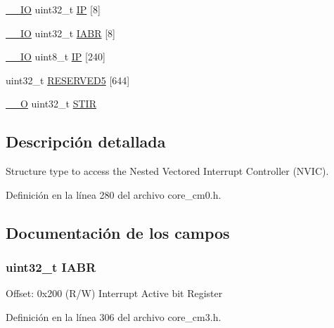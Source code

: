 \begin{DoxyCompactItemize}
\item 
\hyperlink{core__sc300_8h_aec43007d9998a0a0e01faede4133d6be}{\+\_\+\+\_\+\+IO} uint32\+\_\+t \hyperlink{struct_n_v_i_c___type_a519d82311efa6ead6f53b495d3d80de8}{IP} \mbox{[}8\mbox{]}
\item 
\hyperlink{core__sc300_8h_aec43007d9998a0a0e01faede4133d6be}{\+\_\+\+\_\+\+IO} uint32\+\_\+t \hyperlink{struct_n_v_i_c___type_ab61000be19b0293ea14009224fc34fe3}{I\+A\+BR} \mbox{[}8\mbox{]}
\item 
\hyperlink{core__sc300_8h_aec43007d9998a0a0e01faede4133d6be}{\+\_\+\+\_\+\+IO} uint8\+\_\+t \hyperlink{struct_n_v_i_c___type_a38c377984f751265667317981f101bb4}{IP} \mbox{[}240\mbox{]}
\item 
uint32\+\_\+t \hyperlink{struct_n_v_i_c___type_a46aeb40348124934bf802f01806b4f7f}{R\+E\+S\+E\+R\+V\+E\+D5} \mbox{[}644\mbox{]}
\item 
\hyperlink{core__sc300_8h_a7e25d9380f9ef903923964322e71f2f6}{\+\_\+\+\_\+O} uint32\+\_\+t \hyperlink{struct_n_v_i_c___type_a471c399bb79454dcdfb342a31a5684ae}{S\+T\+IR}
\end{DoxyCompactItemize}


\subsection{Descripción detallada}
Structure type to access the Nested Vectored Interrupt Controller (N\+V\+IC). 

Definición en la línea 280 del archivo core\+\_\+cm0.\+h.



\subsection{Documentación de los campos}
\subsubsection[{\texorpdfstring{I\+A\+BR}{IABR}}]{ uint32\+\_\+t I\+A\+BR}\hypertarget{struct_n_v_i_c___type_ab61000be19b0293ea14009224fc34fe3}{}\label{struct_n_v_i_c___type_ab61000be19b0293ea14009224fc34fe3}
Offset\+: 0x200 (R/W) Interrupt Active bit Register 

Definición en la línea 306 del archivo core\+\_\+cm3.\+h.

